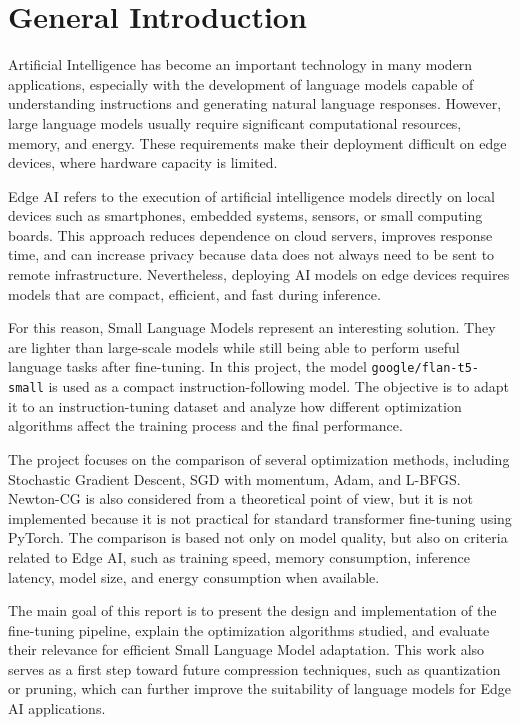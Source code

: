 \chapter{General Introduction}

\vspace*{0.3cm}

Artificial Intelligence has become an important technology in many modern
applications, especially with the development of language models capable of
understanding instructions and generating natural language responses. However,
large language models usually require significant computational resources, memory,
and energy. These requirements make their deployment difficult on edge devices,
where hardware capacity is limited.

\vspace*{0.15cm}

Edge AI refers to the execution of artificial intelligence models directly on
local devices such as smartphones, embedded systems, sensors, or small computing
boards. This approach reduces dependence on cloud servers, improves response time,
and can increase privacy because data does not always need to be sent to remote
infrastructure. Nevertheless, deploying AI models on edge devices requires models
that are compact, efficient, and fast during inference.

\vspace*{0.15cm}

For this reason, Small Language Models represent an interesting solution. They are
lighter than large-scale models while still being able to perform useful language
tasks after fine-tuning. In this project, the model \texttt{google/flan-t5-small}
is used as a compact instruction-following model. The objective is to adapt it to
an instruction-tuning dataset and analyze how different optimization algorithms
affect the training process and the final performance.

\vspace*{0.15cm}

The project focuses on the comparison of several optimization methods, including
Stochastic Gradient Descent, SGD with momentum, Adam, and L-BFGS. Newton-CG is
also considered from a theoretical point of view, but it is not implemented because
it is not practical for standard transformer fine-tuning using PyTorch. The
comparison is based not only on model quality, but also on criteria related to
Edge AI, such as training speed, memory consumption, inference latency, model size,
and energy consumption when available.

\vspace*{0.15cm}

The main goal of this report is to present the design and implementation of the
fine-tuning pipeline, explain the optimization algorithms studied, and evaluate
their relevance for efficient Small Language Model adaptation. This work also
serves as a first step toward future compression techniques, such as quantization
or pruning, which can further improve the suitability of language models for Edge
AI applications.
